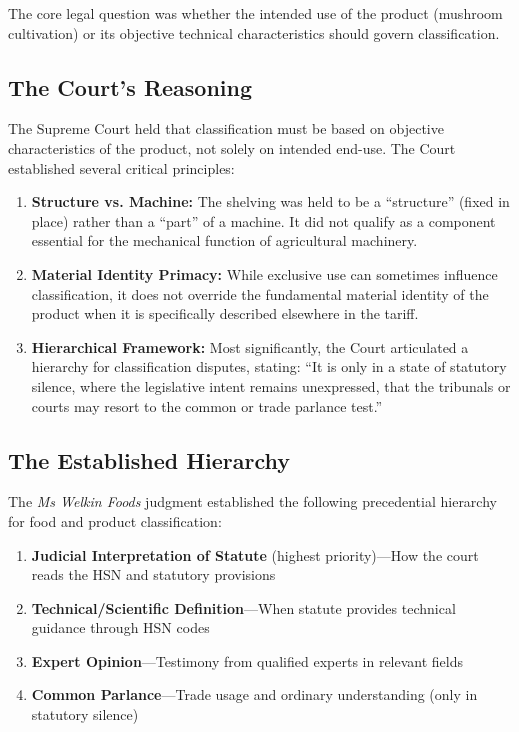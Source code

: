 \documentclass[12pt,a4paper]{article}
\begin{document}
The core legal question was whether the intended use of the product (mushroom cultivation) or its objective technical characteristics should govern classification.

\subsection{The Court's Reasoning}

The Supreme Court held that classification must be based on objective characteristics of the product, not solely on intended end-use. The Court established several critical principles:

\begin{enumerate}
\item \textbf{Structure vs. Machine:} The shelving was held to be a ``structure'' (fixed in place) rather than a ``part'' of a machine. It did not qualify as a component essential for the mechanical function of agricultural machinery.

\item \textbf{Material Identity Primacy:} While exclusive use can sometimes influence classification, it does not override the fundamental material identity of the product when it is specifically described elsewhere in the tariff.

\item \textbf{Hierarchical Framework:} Most significantly, the Court articulated a hierarchy for classification disputes, stating: ``It is only in a state of statutory silence, where the legislative intent remains unexpressed, that the tribunals or courts may resort to the common or trade parlance test.''
\end{enumerate}

\subsection{The Established Hierarchy}

The \textit{Ms Welkin Foods} judgment established the following precedential hierarchy for food and product classification:

\begin{enumerate}
\item \textbf{Judicial Interpretation of Statute} (highest priority)---How the court reads the HSN and statutory provisions
\item \textbf{Technical/Scientific Definition}---When statute provides technical guidance through HSN codes
\item \textbf{Expert Opinion}---Testimony from qualified experts in relevant fields
\item \textbf{Common Parlance}---Trade usage and ordinary understanding (only in statutory silence)
\end{enumerate}
\end{document}
